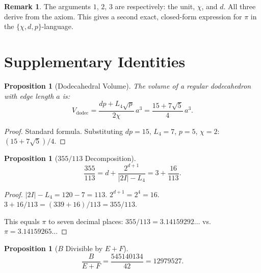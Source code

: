 \documentclass[11pt,a4paper]{article}
\theoremstyle{plain}
\newtheorem{proposition}[theorem]{Proposition}
\theoremstyle{definition}
\newtheorem{remark}[theorem]{Remark}
\begin{document}
\begin{remark}\label{rem:arctan-framework}
The arguments $1$, $2$, $3$ are respectively: the unit, $\chi$, and $d$.
All three derive from the axiom. This gives a second exact, closed-form
expression for $\pi$ in the $\{\chi, d, p\}$-language.
\end{remark}

\section{Supplementary Identities}\label{sec:supplementary}

\begin{proposition}[Dodecahedral Volume]\label{prop:volume}
The volume of a regular dodecahedron with edge length $a$ is:
\begin{equation}\label{eq:volume}
  V_{\mathrm{dodec}} = \frac{dp + L_4\sqrt{p}}{2\chi}\, a^3
  = \frac{15 + 7\sqrt{5}}{4}\, a^3.
\end{equation}
\end{proposition}

\begin{proof}
Standard formula. Substituting $dp = 15$, $L_4 = 7$, $p = 5$, $\chi = 2$:
$(15 + 7\sqrt{5})/4$. \checkmark
\end{proof}

\begin{proposition}[$355/113$ Decomposition]\label{prop:355}
\begin{equation}\label{eq:355}
  \frac{355}{113} = d + \frac{2^{d+1}}{|2I| - L_4}
  = 3 + \frac{16}{113}.
\end{equation}
\end{proposition}

\begin{proof}
$|2I| - L_4 = 120 - 7 = 113$.
$2^{d+1} = 2^4 = 16$.
$3 + 16/113 = (339 + 16)/113 = 355/113$. \checkmark

This equals $\pi$ to seven decimal places:
$355/113 = 3.14159292\ldots$ vs.\ $\pi = 3.14159265\ldots$
\end{proof}

\begin{proposition}[$B$ Divisible by $E + F$]\label{prop:B-42}
\begin{equation}\label{eq:B-42}
  \frac{B}{E + F} = \frac{545140134}{42} = 12979527.
\end{equation}
\end{proposition}
\end{document}
